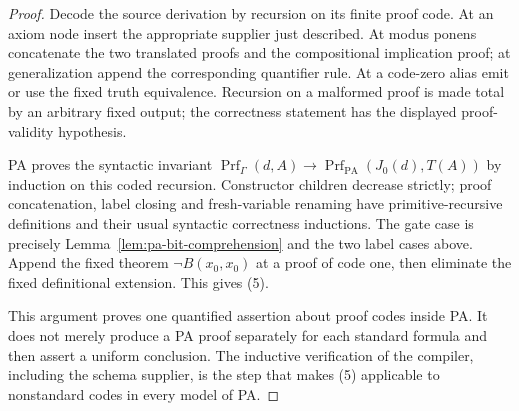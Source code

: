 \begin{proof}
Decode the source derivation by recursion on its finite proof code.
At an axiom node insert the appropriate supplier just described.
At modus ponens concatenate the two translated proofs and the
compositional implication proof; at generalization append the
corresponding quantifier rule. At a code-zero alias emit or use the
fixed truth equivalence. Recursion on a malformed proof is made total
by an arbitrary fixed output; the correctness statement has the
displayed proof-validity hypothesis.

PA proves the syntactic invariant
$\operatorname{Prf}_{\Gamma}(d,A)\to
  \operatorname{Prf}_{\mathrm{PA}}(J_0(d),T(A))$
by induction on this coded recursion. Constructor children decrease
strictly; proof concatenation, label closing and fresh-variable
renaming have primitive-recursive definitions and their usual
syntactic correctness inductions. The gate case is precisely
Lemma~\ref{lem:pa-bit-comprehension} and the two label cases above.
Append the fixed theorem $\neg B(x_0,x_0)$ at a proof of code one,
then eliminate the fixed definitional extension. This gives (5).

This argument proves one quantified assertion about proof codes
inside PA. It does not merely produce a PA proof separately for each
standard formula and then assert a uniform conclusion. The inductive
verification of the compiler, including the schema supplier, is the
step that makes (5) applicable to nonstandard codes in every model
of PA.
\end{proof}

